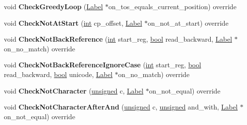 \begin{DoxyCompactItemize}
void {\bfseries Check\+Greedy\+Loop} (\mbox{\hyperlink{classv8_1_1internal_1_1Label}{Label}} $\ast$on\+\_\+tos\+\_\+equals\+\_\+current\+\_\+position) override
\item 
\mbox{\label{classv8_1_1internal_1_1RegExpMacroAssemblerTracer_a1cbd5ae5be461cc354c5a33f40cec62c}} 
void {\bfseries Check\+Not\+At\+Start} (\mbox{\hyperlink{classint}{int}} cp\+\_\+offset, \mbox{\hyperlink{classv8_1_1internal_1_1Label}{Label}} $\ast$on\+\_\+not\+\_\+at\+\_\+start) override
\item 
\mbox{\label{classv8_1_1internal_1_1RegExpMacroAssemblerTracer_a726930a75469eef3f4fc2ad4219315c9}} 
void {\bfseries Check\+Not\+Back\+Reference} (\mbox{\hyperlink{classint}{int}} start\+\_\+reg, \mbox{\hyperlink{classbool}{bool}} read\+\_\+backward, \mbox{\hyperlink{classv8_1_1internal_1_1Label}{Label}} $\ast$on\+\_\+no\+\_\+match) override
\item 
\mbox{\label{classv8_1_1internal_1_1RegExpMacroAssemblerTracer_a0a603eb323565872f21e5f31a1fbaf3b}} 
void {\bfseries Check\+Not\+Back\+Reference\+Ignore\+Case} (\mbox{\hyperlink{classint}{int}} start\+\_\+reg, \mbox{\hyperlink{classbool}{bool}} read\+\_\+backward, \mbox{\hyperlink{classbool}{bool}} unicode, \mbox{\hyperlink{classv8_1_1internal_1_1Label}{Label}} $\ast$on\+\_\+no\+\_\+match) override
\item 
\mbox{\label{classv8_1_1internal_1_1RegExpMacroAssemblerTracer_ac7a921ece0f9e85613b67b5f802f1968}} 
void {\bfseries Check\+Not\+Character} (\mbox{\hyperlink{classunsigned}{unsigned}} c, \mbox{\hyperlink{classv8_1_1internal_1_1Label}{Label}} $\ast$on\+\_\+not\+\_\+equal) override
\item 
\mbox{\label{classv8_1_1internal_1_1RegExpMacroAssemblerTracer_a7cc32c02d687c2c51949c286b4a67416}} 
void {\bfseries Check\+Not\+Character\+After\+And} (\mbox{\hyperlink{classunsigned}{unsigned}} c, \mbox{\hyperlink{classunsigned}{unsigned}} and\+\_\+with, \mbox{\hyperlink{classv8_1_1internal_1_1Label}{Label}} $\ast$on\+\_\+not\+\_\+equal) override
\item 
\mbox{\label{classv8_1_1internal_1_1RegExpMacroAssemblerTracer_af750b6fd43fbaea2ecc9ecbd09106ba4}} 

\end{DoxyCompactItemize}
